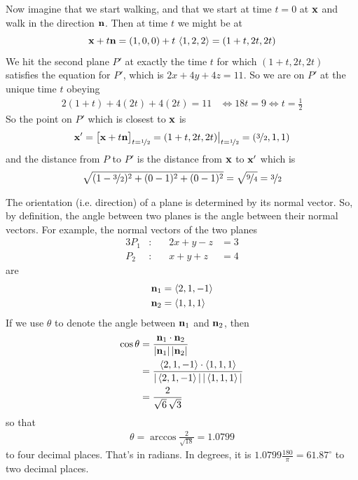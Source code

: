 \begin{eg}
Now imagine that we start walking, and that we start at time $t=0$ at $\mathbf{x}$ 
and walk in the direction $\mathbf{n}$. Then at time $t$ we might be at
\begin{equation*}
\mathbf{x}+t\mathbf{n} = (1,0,0) +t\,\left< 1,2,2\right>
         = (1+t, 2t, 2t)
\end{equation*}
We hit the second plane $P'$ at exactly the time $t$ for which 
$(1+t, 2t, 2t)$ satisfies the equation for $P'$, which is 
$2x+4y+4z=11$. So we are on $P'$ at the unique time $t$ obeying
\begin{align*}
2(1+t)+4(2t)+4(2t)=11
&\iff 18t = 9 
\iff t=\frac{1}{2}
\end{align*}
So the point on $P'$ which is closest to $\mathbf{x}$ is
\begin{align*}
\mathbf{x}' = \big[\mathbf{x}+t\mathbf{n}\big]_{t=\nicefrac{1}{2}} 
     = (1+t, 2t, 2t)\big|_{t=\nicefrac{1}{2}}
     = (\nicefrac{3}{2}, 1, 1) 
\end{align*}
and the distance from $P$ to $P'$ is the distance from
$\mathbf{x}$ to $\mathbf{x}'$ which is
\begin{align*}
\sqrt{(1-\nicefrac{3}{2})^2+(0-1)^2+(0-1)^2}
=\sqrt{\nicefrac{9}{4}}
=\nicefrac{3}{2}
\end{align*}
\end{eg}

\begin{eg}\label{eg:VPangle-Planes}
The orientation (i.e. direction) of a plane is determined by its normal vector.
So, by definition, the angle between two planes is the angle between their
normal vectors. For example, the normal vectors of the two planes
\begin{alignat*}{3}
P_1&:\quad & 2x+y-z&=3\\
P_2&: &  x+y+z&=4
\end{alignat*} 
are
\begin{align*}
\mathbf{n}_1&=\left< 2,1,-1\right> \\
\mathbf{n}_2&=\left< 1,1,1\right>
\end{align*}
If we use $\theta$ to denote the angle between $\mathbf{n}_1$ and $\mathbf{n}_2$, then
\begin{align*}
\cos\theta &=\frac{\mathbf{n}_1\cdot\mathbf{n}_2}{|\mathbf{n}_1|\,|\mathbf{n}_2|} \\
           &=\frac{\left< 2,1,-1\right>\cdot\left< 1,1,1\right>}
                       {|\left< 2,1,-1\right>|\,|\left< 1,1,1\right>|} \\
           &=\frac{2}{\sqrt{6}\,\sqrt{3}}
\end{align*} 
so that
\begin{align*}
\theta =\arccos\frac{2}{\sqrt{18}} =1.0799
\end{align*}
to four decimal places. That's in radians. In degrees, it is
$1.0799\frac{180}{\pi}=61.87^\circ$ to two decimal places.
\end{eg}



